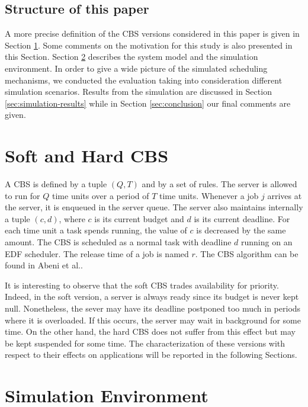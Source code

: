 \documentclass[12pt]{article}
\begin{document}
\subsection{Structure of this paper}
\label{sec:structure-this-paper}

A more precise definition of the CBS versions considered in this
paper is given in Section \ref{sec:soft-hard-cbs}. Some comments on the motivation for 
this study is also presented in this Section.  
Section \ref{sec:simul-envir} describes the system model and the
simulation environment.  In order to give a wide picture of the
simulated scheduling mechanisms, we conducted the evaluation taking
into consideration different simulation scenarios. Results from the
simulation are discussed in Section \ref{sec:simulation-results} while
in Section \ref{sec:conclusion} our final comments are given.

\section{Soft and Hard CBS}
\label{sec:soft-hard-cbs}

A CBS \cite{abeni.ea98:integrating} is defined by a tuple $(Q,T)$ and
by a set of rules. The server is allowed to run for $Q$ time units
over a period of $T$ time units. Whenever a job $j$ arrives at the
server, it is enqueued in the server queue. The server also maintains
internally a tuple $(c,d)$, where $c$ is its current budget and $d$ is
its current deadline. For each time unit a task spends running, the
value of $c$ is decreased by the same amount. The CBS is scheduled as
a normal task with deadline $d$ running on an EDF scheduler. The
release time of a job is named $r$. The CBS algorithm can be found in
Abeni et al.\cite{abeni.ea98:integrating}.

It is interesting to observe that the soft CBS trades availability for
priority.  Indeed, in the soft version, a server is always ready since
its budget is never kept null.  Nonetheless, the sever may have its
deadline postponed too much in periods where it is overloaded. If this
occurs, the server may wait in background for some time.  On the other
hand, the hard CBS does not suffer from this effect but may be kept
suspended for some time.  The characterization of these versions with
respect to their effects on applications will be reported in the
following Sections.
 
\section{Simulation Environment}
\label{sec:simul-envir}
\end{document}
